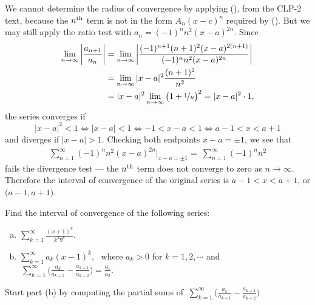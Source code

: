 \begin{solution}
We cannot determine the radius of convergence by applying (), from the 
CLP-2 text, because the $n^{\rm th}$ term is not in the form $A_n (x-c)^n$ required by 
(). But we may still apply the ratio test with $a_n= (-1)^n n^2(x-a)^{2n}$.
Since
\begin{align*}
\lim_{n\to\infty} \bigg| \frac{a_{n+1}}{a_n} \bigg|
&= \lim_{n\to\infty} \bigg| \frac{(-1)^{n+1} (n+1)^2(x-a)^{2(n+1)}}
                                 {(-1)^n n^2(x-a)^{2n}} \bigg| \\
&= \lim_{n\to\infty} |x-a|^2 \frac{(n+1)^2}{n^2} \\
&= |x-a|^2 \lim_{n\to\infty} \big(1+\nicefrac{1}{n}\big)^2 = |x-a|^2\cdot1.
\end{align*}
the series converges if
\begin{equation*}
|x-a|^2<1
\iff |x-a|<1
\iff-1<x-a<1
\iff a-1<x<a+1
\end{equation*}
and diverges if $|x-a|>1$.
Checking both endpoints $x-a=\pm 1$, we see that
\begin{align*}
 \sum_{n=1}^\infty (-1)^n n^2(x-a)^{2n}\bigg|_{x-a=\pm 1}
=\ \sum_{n=1}^\infty (-1)^n n^2
\end{align*}
fails the divergence test --- the $n^{\rm th}$ term does not converge
to zero as $n\rightarrow\infty$. Therefore the interval of convergence
of the original series is  $a-1< x<a+1$,  or $\big(a-1,a+1\big)$.

\end{solution}




\begin{Mquestion}[2015A]
 Find the interval of convergence of the following series:
\begin{enumerate}[(a)]
\item
${\displaystyle \sum_{k=1}^\infty \frac{(x+1)^k}{k^2 9^k}}$.
\item
${\displaystyle \sum_{k=1}^\infty a_k(x-1)^k}$, \ where
$a_k>0$ for $k=1,2,\cdots$ and
$\ {\displaystyle \sum_{k=1}^\infty \Big(\frac{a_k}{a_{k+1}}
                         -\frac{a_{k+1}}{a_{k+2}}\Big)
   =\frac{a_1}{a_2} }$.
\end{enumerate}
\end{Mquestion}

\begin{hint}
Start part (b) by computing the partial sums of
$\ {\displaystyle \sum_{k=1}^\infty \Big(\frac{a_k}{a_{k+1}}
                         -\frac{a_{k+1}}{a_{k+2}}\Big)}$
\end{hint}

